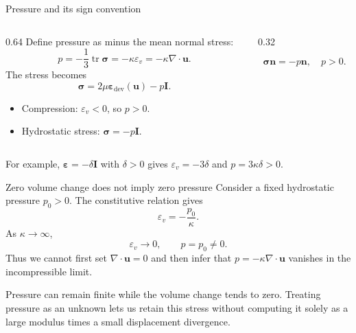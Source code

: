 \documentclass[11pt,aspectratio=169]{beamer}
\newcommand{\bu}{\bm u}
\newcommand{\bn}{\bm n}
\newcommand{\bI}{\bm I}
\newcommand{\beps}{\bm\varepsilon}
\newcommand{\bsig}{\bm\sigma}
\newcommand{\divg}{\nabla\!\cdot}
\DeclareMathOperator{\tr}{tr}
\begin{document}
\begin{frame}{Pressure and its sign convention}
\begin{columns}[c,onlytextwidth]
\begin{column}{0.64\textwidth}
Define pressure as minus the mean normal stress:
\[
\boxed{p=-\frac13\tr\bsig=-\kappa\varepsilon_v
=-\kappa\divg\bu.}
\]
The stress becomes
\[
\boxed{\bsig=2\mu\beps_{\mathrm{dev}}(\bu)-p\bI.}
\]
\begin{itemize}
\item Compression: $\varepsilon_v<0$, so $p>0$.
\item Hydrostatic stress: $\bsig=-p\bI$.
\end{itemize}
\end{column}
\begin{column}{0.32\textwidth}
\centering
{}
\[
\bsig\bn=-p\bn,\quad p>0.
\]
\end{column}
\end{columns}
\vspace{0.15cm}
For example, $\beps=-\delta\bI$ with $\delta>0$ gives
$\varepsilon_v=-3\delta$ and $p=3\kappa\delta>0$.
\end{frame}

\begin{frame}{Zero volume change does not imply zero pressure}
Consider a fixed hydrostatic pressure $p_0>0$. The constitutive relation gives
\[
\varepsilon_v=-\frac{p_0}{\kappa}.
\]
As $\kappa\to\infty$,
\[
\varepsilon_v\longrightarrow0,\qquad p=p_0\ne0.
\]
Thus we cannot first set $\divg\bu=0$ and then infer that
$p=-\kappa\divg\bu$ vanishes in the incompressible limit.

Pressure can remain finite while the volume change tends to zero.
Treating pressure as an unknown lets us retain this stress without computing
it solely as a large modulus times a small displacement divergence.
\end{frame}
\end{document}
